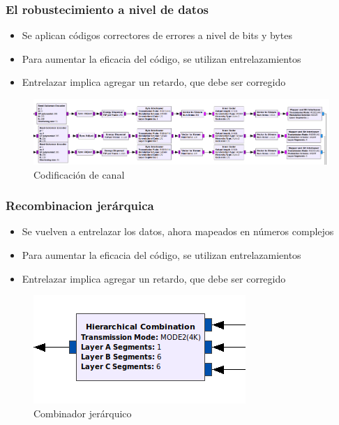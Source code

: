 \begin{frame}
\frametitle{El robustecimiento a nivel de datos}
\begin{itemize}	
	\item { Se aplican códigos correctores de errores a nivel de bits y bytes}
	\item {	Para aumentar la eficacia del código, se utilizan entrelazamientos}
	\item { Entrelazar implica agregar un retardo, que debe ser corregido }
\end{itemize}
\begin{figure}
	\includegraphics[scale=0.22]{rob_datos}
	\caption{Codificación de canal}
\end{figure}
\end{frame}
\begin{frame}
\frametitle{Recombinacion jerárquica}
\begin{itemize}	
	\item { Se vuelven a entrelazar los datos, ahora mapeados en números complejos}
	\item {	Para aumentar la eficacia del código, se utilizan entrelazamientos}
	\item { Entrelazar implica agregar un retardo, que debe ser corregido }
\end{itemize}
\begin{figure}
	\includegraphics[scale=0.55]{h_conv}
	\caption{Combinador jerárquico}
\end{figure}
\end{frame}
